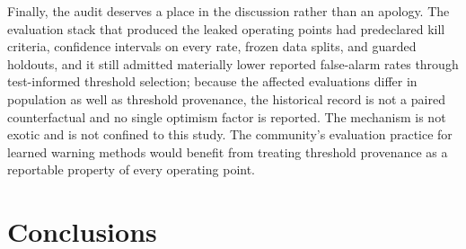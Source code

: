\documentclass[11pt]{article}
\begin{document}
Finally, the audit deserves a place in the discussion rather than an apology. The evaluation
stack that produced the leaked operating points had predeclared kill criteria, confidence
intervals on every rate, frozen data splits, and guarded holdouts, and it still admitted
materially lower reported false-alarm rates through test-informed threshold selection; because
the affected evaluations differ in population as well as threshold provenance, the historical
record is not a paired counterfactual and no single optimism factor is reported. The mechanism
is not exotic and is not confined to this study. The community's evaluation practice for learned warning methods would benefit from
treating threshold provenance as a reportable property of every operating point.

\section{Conclusions}
\end{document}
